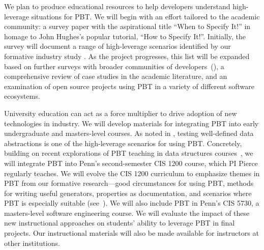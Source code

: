 {We plan to produce educational resources to help developers understand
high-leverage situations for PBT. We will begin with an effort
tailored to the academic community: a survey paper with the
aspirational title ``When to Specify It!'' in homage to John Hughes's
popular tutorial, ``How to Specify It!''. Initially,
the survey will
document a  range of high-leverage scenarios identified by our formative
industry study%
.%
As the project progresses, this list will be expanded based on
further surveys with broader
communities of developers~(), a comprehensive
review of case studies in
the academic literature, and an examination of open source projects
using PBT in a
variety of different software ecosystems.

%
University education can act as a force
multiplier to drive adoption of new
technologies in industry.
We will develop materials for
integrating PBT into early undergraduate and masters-level courses. As
noted in , testing well-defined data
abstractions is one of the high-leverage scenarios for using PBT.
%
Concretely, building on
recent explorations of PBT teaching in data structures
courses~\cite{wrenn2021using, nelson2021automated}, we will integrate PBT into
Penn's second-semester CIS 1200 course, which PI Pierce regularly teaches.
%
We
will evolve the CIS 1200 curriculum to emphasize themes in PBT from our
formative research---good circumstances for
using PBT, methods for writing useful generators, properties as
documentation, and scenarios where PBT is especially suitable
(see~).
%
We will also include PBT in Penn's CIS 5730, a masters-level software
engineering course.
%
We will evaluate the impact of these new
instructional approaches on students' ability to leverage PBT in final
projects.
%
Our instructional materials will also be made available for
instructors at other institutions.

}
